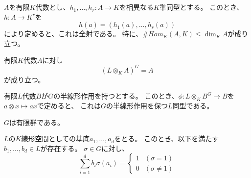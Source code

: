 %

\chapter{}

\begin{proposition}\label{alg-hom}
    $A$を有限$K$代数とし、$h_1,\ldots,h_r:A\to K$を相異なる$K$準同型とする。
    このとき、$h:A\to K^r$を
    $$
    h(a)=(h_1(a),\ldots,h_r(a))
    $$
    により定めると、これは全射である。
    特に、$\# Hom_K(A,K)\leq\dim_KA$が成り立つ。
\end{proposition}

\begin{theorem}\label{Galois-descent1}
    有限$K$代数$A$に対し
    $$
    (L\otimes_K A)^G=A
    $$
    が成り立つ。
\end{theorem}

\begin{theorem}\label{Galois-descent2}
    有限$L$代数$B$が$G$の半線形作用を持つとする。
    このとき、$\phi:L\otimes_KB^G\to B$を$a\otimes x\mapsto ax$で定めると、
    これは$G$の半線形作用を保つ$L$同型である。
\end{theorem}

\begin{lemma}\label{finite}
    $G$は有限群である。
\end{lemma}

\begin{lemma}\label{basis}
    $L$の$K$線形空間としての基底$a_1,\ldots,a_d$をとる。
    このとき、以下を満たす$b_1,\ldots,b_d\in L$が存在する。
    $\sigma\in G$に対し、
    $$
    \sum_{i=1}^db_i\sigma(a_i)=
    \begin{cases}
        1 & (\sigma=1)\\
        0 & (\sigma\neq 1)
    \end{cases}
    $$
\end{lemma}

